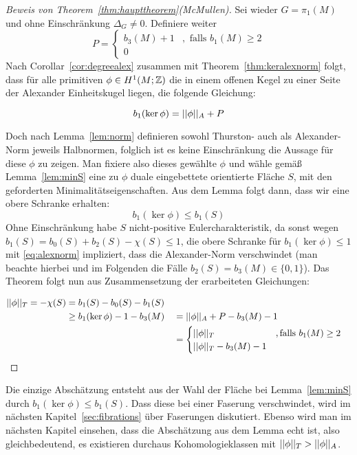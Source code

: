 \begin{proof}[Beweis von Theorem~\ref{thm:haupttheorem}(McMullen)]
	Sei wieder $G=\pi_1(M)$ und ohne Einschränkung $\Delta_G\neq 0$. Definiere weiter \[
	P=\begin{cases}
		b_3(M)+1 &, \text{ falls } b_1(M) \geq 2	\\
		0
	\end{cases}
	\]	
	Nach Corollar~\ref{cor:degreealex} zusammen mit Theorem~\ref{thm:keralexnorm} folgt, dass für alle primitiven $\phi \in H^1(M;\mathbb{Z})$ die in einem offenen Kegel zu einer Seite der Alexander Einheitskugel liegen, die folgende Gleichung:
	
		\begin{equation}
		b_1(\ker\phi)= ||\phi||_A + P \label{eq:alexnorm}
		\end{equation}
	
	Doch nach Lemma~\ref{lem:norm} definieren sowohl Thurston- auch als Alexander-Norm jeweils Halbnormen, folglich ist es keine Einschränkung die Aussage für diese $\phi$ zu zeigen. Man fixiere also dieses gewählte $\phi$ und wähle gemäß Lemma~\ref{lem:minS} eine zu $\phi$ duale eingebettete orientierte Fläche $S$, mit den geforderten Minimalitätseigenschaften. Aus dem Lemma folgt dann, dass wir eine obere Schranke erhalten:
	\begin{equation}
		b_1(\ker\phi) \leq b_1(S) \label{eq:obereSchrankeS}
	\end{equation}
	Ohne Einschränkung habe $S$ nicht-positive Eulercharakteristik, da sonst wegen $b_1(S)= b_0(S) + b_2(S) - \chi(S) \leq 1$, die obere Schranke für $b_1(\ker\phi)\leq 1$  mit \eqref{eq:alexnorm} impliziert, dass die Alexander-Norm verschwindet (man beachte hierbei und im Folgenden die Fälle $b_2(S)=b_3(M) \in \{0,1\}$). Das Theorem folgt nun aus Zusammensetzung der erarbeiteten Gleichungen:
	
		\begin{align*}
		||\phi||_T = -\chi(S) &= b_1(S)-b_0(S)-b_1(S)\\
					&\geq b_1(\ker\phi) -1-b_3(M) &&= ||\phi||_A +P -b_3(M)-1\\
					&&& = \begin{cases}
						||\phi||_T &, \text{falls } b_1(M)\geq 2\\
						||\phi||_T -b_3(M)-1
					\end{cases}
		\end{align*}
\end{proof} 
	Die einzige Abschätzung entsteht aus der Wahl der Fläche bei Lemma~\ref{lem:minS} durch $b_1(\ker\phi)\leq b_1(S)$. Dass diese bei einer Faserung verschwindet, wird im nächsten Kapitel~\ref{sec:fibrations} über Faserungen diskutiert. Ebenso wird man im nächsten Kapitel einsehen, dass die Abschätzung aus dem Lemma echt ist, also gleichbedeutend, es existieren durchaus Kohomologieklassen mit $||\phi||_T > ||\phi||_A$.